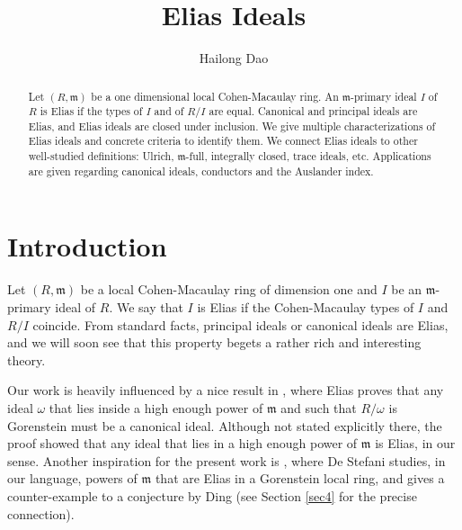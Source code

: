 \documentclass[a4paper,12pt]{amsart}
\theoremstyle{definition}
\theoremstyle{remark}
\numberwithin{equation}{section}
\def\fm{\mathfrak{m}}
\begin{document}
\title[Elias Ideals]{Elias Ideals}
 

\author[Hailong Dao]{Hailong Dao}
\address{Hailong Dao\\ Department of Mathematics \\ University of Kansas\\405 Snow Hall, 1460 Jayhawk Blvd.\\ Lawrence, KS 66045}




 \begin{abstract}
Let $(R, \mathfrak m)$ be a one dimensional local Cohen-Macaulay ring. An $\mathfrak m$-primary ideal $I$ of $R$ is Elias if the types of $I$ and of $R/I$ are equal. Canonical and principal ideals are Elias, and Elias ideals are closed under inclusion. We give multiple characterizations of Elias ideals and concrete criteria to identify them. We connect Elias ideals to other well-studied definitions: Ulrich, $\fm$-full, integrally closed, trace ideals, etc.  Applications are given regarding canonical ideals, conductors and the Auslander index. 
 \end{abstract}
 




\maketitle

\section*{Introduction}
Let $(R, \fm)$ be a local Cohen-Macaulay ring of dimension one and $I$ be an $\fm$-primary ideal of $R$. We say that $I$ is Elias if the Cohen-Macaulay types of $I$ and $R/I$ coincide. From standard facts, principal ideals or canonical ideals are Elias, and we will soon see that this property begets a rather rich and interesting theory. 


Our work is heavily influenced by a nice result in \cite{Eli}, where Elias proves that any ideal $\omega$ that lies inside a high enough power of $\fm$ and such that $R/\omega$ is Gorenstein must be a canonical ideal. Although not stated explicitly there, the proof showed that any ideal that lies in a high enough power of $\fm$ is Elias, in our sense.  Another inspiration for the present work is \cite{DeS}, where De Stefani studies, in our language, powers of $\fm$ that are Elias in a Gorenstein local ring, and gives a  counter-example to a conjecture by Ding (see Section \ref{sec4} for the precise connection).  
\end{document}
